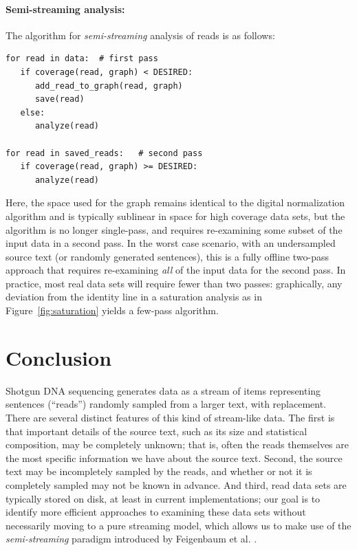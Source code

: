 \paragraph*{Semi-streaming analysis:} The algorithm for {\em semi-streaming} analysis of reads is as
follows:
\begin{verbatim}
for read in data:  # first pass
   if coverage(read, graph) < DESIRED:
      add_read_to_graph(read, graph)
      save(read)
   else:
      analyze(read)

for read in saved_reads:   # second pass
   if coverage(read, graph) >= DESIRED:
      analyze(read)
\end{verbatim}
Here, the space used for the graph remains identical to the digital
normalization algorithm and is typically sublinear in space for high
coverage data sets, but the algorithm is no longer single-pass, and
requires re-examining some subset of the input data in a second pass.
In the worst case scenario, with an undersampled source text (or
randomly generated sentences), this is a fully offline two-pass
approach that requires re-examining {\em all} of the input data for
the second pass.  In practice, most real data sets will require fewer
than two passes: graphically, any deviation from the identity line in
a saturation analysis as in Figure~\ref{fig:saturation} yields a
few-pass algorithm.


\section{Conclusion}



Shotgun DNA sequencing generates data as a stream
of items representing sentences (``reads'') randomly sampled from a
larger text, with replacement. There are several distinct features of this kind
of stream-like data.
 The first is that important details of the source text,
such as its size and statistical composition, may be completely
unknown; that is, often the reads themselves are the most specific
information we have about the source text.  Second, the source text
may be incompletely sampled by the reads, and whether or not it is
completely sampled may not be known in advance.  And third, read
data sets are typically stored on disk, at least in current
implementations; our goal is to identify more efficient approaches to
examining these data sets without necessarily moving to a pure
streaming model, which allows us to make use of the {\em
  semi-streaming} paradigm introduced by Feigenbaum et
al. \cite{Feigenbaum2005}.

